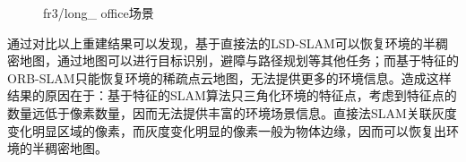 \begin{figure}[h]
\centering
\caption{fr3/long\_ office场景}
\label{fig3.10}
\end{figure}

通过对比以上重建结果可以发现，基于直接法的LSD-SLAM可以恢复环境的半稠密地图，通过地图可以进行目标识别，避障与路径规划等其他任务；而基于特征的ORB-SLAM只能恢复环境的稀疏点云地图，无法提供更多的环境信息。造成这样结果的原因在于：基于特征的SLAM算法只三角化环境的特征点，考虑到特征点的数量远低于像素数量，因而无法提供丰富的环境场景信息。直接法SLAM关联灰度变化明显区域的像素，而灰度变化明显的像素一般为物体边缘，因而可以恢复出环境的半稠密地图。

